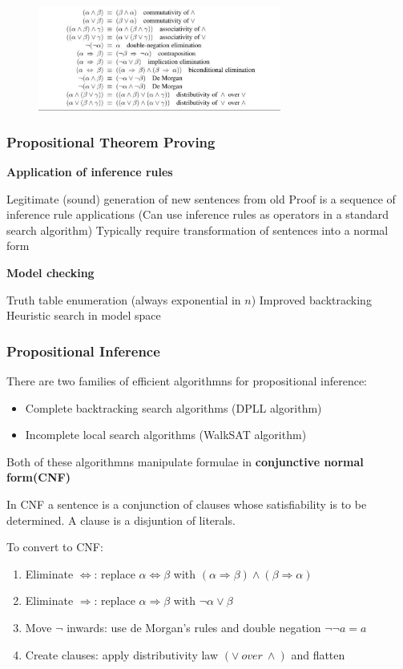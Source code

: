 \documentclass{article}
\begin{document}
\begin{figure}[ht]
\includegraphics[width=8cm]{Standard Logical Equivalences.png}
\centering
\end{figure}

\subsubsection{Propositional Theorem Proving}

\textbf{Application of inference rules}

Legitimate (sound) generation of new sentences from old
Proof is a sequence of inference rule applications (Can use inference rules as operators in a standard search algorithm)
Typically require transformation of sentences into a normal form

\textbf{Model checking}

Truth table enumeration (always exponential in $n$)
Improved backtracking
Heuristic search in model space


\subsubsection{Propositional Inference}

There are two families of efficient algorithmns for propositional inference:
\begin{itemize}
    \item Complete backtracking search algorithms (DPLL algorithm)
    \item Incomplete local search algorithms (WalkSAT algorithm)
\end{itemize}

Both of these algorithmns manipulate formulae in \textbf{conjunctive normal form(CNF)}

In CNF a sentence is a conjunction of clauses whose satisfiability is to be determined. A clause is a disjuntion of literals.  \newline

To convert to CNF:
\begin{enumerate}
    \item Eliminate $\Leftrightarrow$: replace $\alpha \Leftrightarrow \beta$ with $(\alpha \Rightarrow \beta)\wedge(\beta \Rightarrow \alpha)$
    \item Eliminate $\Rightarrow$: replace $\alpha \Rightarrow \beta$ with $\neg \alpha \vee \beta$
    \item Move $\neg$ inwards: use de Morgan's rules and double negation $\neg \neg a = a$
    \item Create clauses: apply distributivity law $(\vee \: over \: \wedge)$ and flatten
\end{enumerate}
\end{document}
